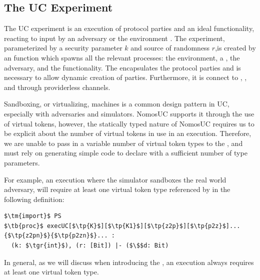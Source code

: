 \subsection{The UC Experiment}
The UC experiment is an execution of protocol parties and an ideal functionality, reacting to input by an adversary \A or the environment \Z.
The experiment, parameterized by a security parameter $k$ and source of randomness $r$,is created by an  function  which spawns all the relevant processes: the environment, a \partywrapper, the adversary, and the functionality.
The \partywrapper encapsulates the protocol parties and is necessary to allow dynamic creation of parties. 
Furthermore, it is connect to \Z, \A, and \F through providerless channels.

Sandboxing, or virtualizing, machines  is a common design pattern in UC, especially with adversaries and simulators.
NomosUC supports it through the use of virtual tokens, however, the statically typed nature of NomosUC requires us to be explicit about the number of virtual tokens in use in an execution.
Therefore, we are unable to pass in a variable number of virtual token types to the , and must rely on generating simple code  to declare  with a sufficient number of type parameters.

For example, an execution where the simulator sandboxes the real world adversary,  will require at least one virtual token type referenced by  in the following definition:
\begin{lstlisting}[basicstyle=\footnotesize\BeraMonottFamily, frame=single, mathescape, caption={The process definition of the \msf{execUC} function.}]
$\tm{import}$ PS 
$\tb{proc}$ execUC[$\tp{K}$][$\tp{K1}$][$\tp{z2p}$][$\tp{p2z}$]...{$\tp{z2pn}$}{$\tp{p2zn}$}... :
  (k: $\tgr{int}$), (r: [Bit]) |- ($\$$d: Bit)
\end{lstlisting}
In general, as we will discuss when introducing the \partywrapper, an execution always requires at least one virtual token type.

%

